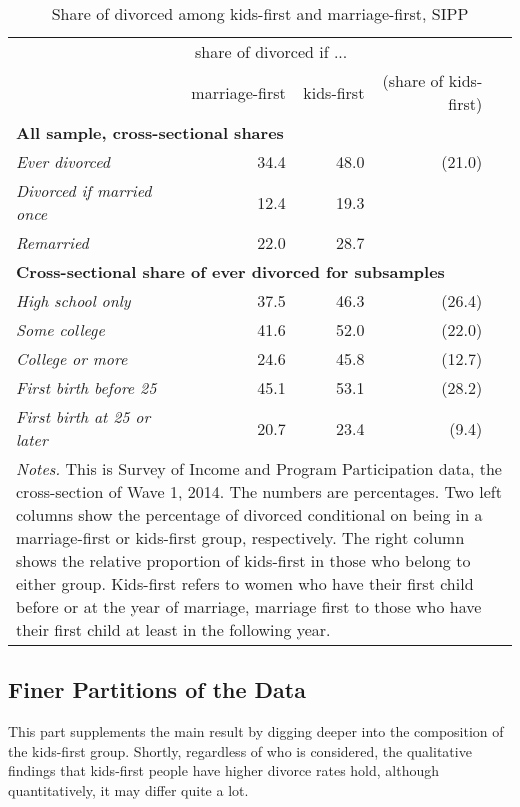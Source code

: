 \documentclass[12pt,letter]{article}
\begin{document}
\begin{table}[h]
\caption{Share of divorced among kids-first and marriage-first, SIPP\label{share_table_0}}
\begin{center}
\begin{tabular}{l r r r r }
\hline
& \multicolumn{2}{c}{share of divorced if ... }&  \\
&  marriage-first & kids-first & (share of kids-first) &  \\\hline
\multicolumn{5}{l}{\textbf{All sample, cross-sectional shares}} \\\hline
\textit{Ever divorced} & 34.4 & 48.0 & (21.0) \\
\textit{Divorced if married once} &  12.4 & 19.3 & \\
\textit{Remarried} &  22.0 & 28.7 &  \\
\multicolumn{5}{l}{\textbf{Cross-sectional share of ever divorced for subsamples}} \\\hline
\textit{High school only} &  37.5 & 46.3 & (26.4) \\
\textit{Some college} & 41.6 & 52.0 & (22.0) \\
\textit{College or more} &   24.6 & 45.8 & (12.7)\\\hline
\textit{First birth before 25} & 45.1 & 53.1 & (28.2) \\
\textit{First birth at 25 or later} &  20.7 & 23.4 & (9.4)  \\\hline
\multicolumn{5}{p{0.8\linewidth}}{\footnotesize \textit{Notes.} This is Survey of Income and Program Participation data, the cross-section of Wave 1, 2014. The numbers are percentages. Two left columns show the percentage of divorced conditional on being in a marriage-first or kids-first group, respectively. The right column shows the relative proportion of kids-first in those who belong to either group.  Kids-first refers to women who have their first child before or at the year of marriage, marriage first to those who have their first child at least in the following year.  }\\\hline\hline
\end{tabular}
\end{center}
\end{table}


\subsection{Finer Partitions of the Data}
This part supplements the main result by digging deeper into the composition of the kids-first group. Shortly, regardless of who is considered, the qualitative findings that kids-first people have higher divorce rates hold, although quantitatively, it may differ quite a lot.
\end{document}
